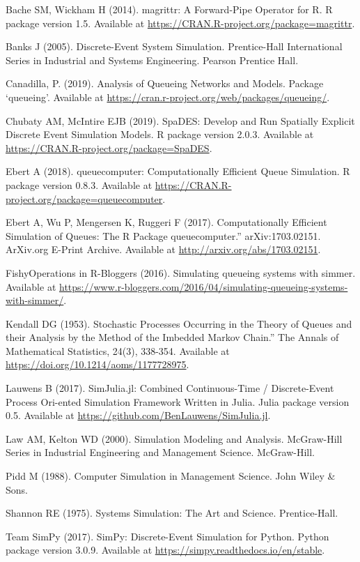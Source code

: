 \documentclass[
]{book}
\theoremstyle{definition}
\theoremstyle{definition}
\theoremstyle{definition}
\theoremstyle{definition}
\theoremstyle{remark}
\begin{document}
Bache SM, Wickham H (2014). magrittr: A Forward-Pipe Operator for R. R package version 1.5. Available at \url{https://CRAN.R-project.org/package=magrittr}.

Banks J (2005). Discrete-Event System Simulation. Prentice-Hall International Series in Industrial and Systems Engineering. Pearson Prentice Hall.

Canadilla, P. (2019). Analysis of Queueing Networks and Models. Package `queueing'. Available at \url{https://cran.r-project.org/web/packages/queueing/}.

Chubaty AM, McIntire EJB (2019). SpaDES: Develop and Run Spatially Explicit Discrete Event Simulation Models. R package version 2.0.3. Available at \url{https://CRAN.R-project.org/package=SpaDES}.

Ebert A (2018). queuecomputer: Computationally Efficient Queue Simulation. R package version 0.8.3. Available at \url{https://CRAN.R-project.org/package=queuecomputer}.

Ebert A, Wu P, Mengersen K, Ruggeri F (2017). Computationally Efficient Simulation of Queues: The R Package queuecomputer.'' arXiv:1703.02151. ArXiv.org E-Print Archive. Available at \url{http://arxiv.org/abs/1703.02151}.

FishyOperations in R-Bloggers (2016). Simulating queueing systems with simmer. Available at \url{https://www.r-bloggers.com/2016/04/simulating-queueing-systems-with-simmer/}.

Kendall DG (1953). Stochastic Processes Occurring in the Theory of Queues and their Analysis by the Method of the Imbedded Markov Chain.'' The Annals of Mathematical Statistics, 24(3), 338-354. Available at \url{https://doi.org/10.1214/aoms/1177728975}.

Lauwens B (2017). SimJulia.jl: Combined Continuous-Time / Discrete-Event Process Ori-ented Simulation Framework Written in Julia. Julia package version 0.5. Available at \url{https://github.com/BenLauwens/SimJulia.jl}.

Law AM, Kelton WD (2000). Simulation Modeling and Analysis. McGraw-Hill Series in
Industrial Engineering and Management Science. McGraw-Hill.

Pidd M (1988). Computer Simulation in Management Science. John Wiley \& Sons.

Shannon RE (1975). Systems Simulation: The Art and Science. Prentice-Hall.

Team SimPy (2017). SimPy: Discrete-Event Simulation for Python. Python package version
3.0.9. Available at \url{https://simpy.readthedocs.io/en/stable}.
\end{document}
